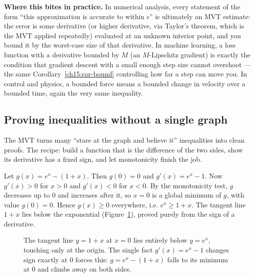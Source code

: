 \begin{applicationbox}
\textbf{Where this bites in practice.} In numerical analysis, every statement of the
form ``this approximation is accurate to within $\epsilon$'' is ultimately an MVT
estimate: the error is some derivative (or higher derivative, via Taylor's theorem,
which is the MVT applied repeatedly) evaluated at an unknown interior point, and you
bound it by the worst-case size of that derivative. In machine learning, a loss
function with a derivative bounded by $M$ (an $M$-Lipschitz gradient) is exactly the
condition that gradient descent with a small enough step size cannot overshoot ---
the same Corollary~\ref{ch15:cor-bound} controlling how far a step can move you. In
control and physics, a bounded force means a bounded change in velocity over a
bounded time, again the very same inequality.
\end{applicationbox}

\subsection{Proving inequalities without a single graph}

The MVT turns many ``stare at the graph and believe it'' inequalities into clean
proofs. The recipe: build a function that is the difference of the two sides, show
its derivative has a fixed sign, and let monotonicity finish the job.

\begin{example}\label{ch15:ex-exp-ineq}
Let $g(x)=e^x-(1+x)$. Then $g(0)=0$ and $g'(x)=e^x-1$. Now $g'(x)>0$ for $x>0$ and
$g'(x)<0$ for $x<0$. By the monotonicity test, $g$ decreases up to $0$ and
increases after it, so $x=0$ is a global minimum of $g$, with value $g(0)=0$. Hence
$g(x)\ge 0$ everywhere, i.e. $e^x\ge 1+x$. The tangent line $1+x$ lies below the
exponential (Figure~\ref{ch15:fig-exp-ineq}), proved purely from the sign of a
derivative.
\end{example}

\begin{figure}[H]
\centering
{}
\caption{The tangent line $y=1+x$ at $x=0$ lies entirely below $y=e^x$, touching
only at the origin. The single fact $g'(x)=e^x-1$ changes sign exactly at $0$
forces this: $g=e^x-(1+x)$ falls to its minimum at $0$ and climbs away on both
sides.}
\label{ch15:fig-exp-ineq}
\end{figure}

